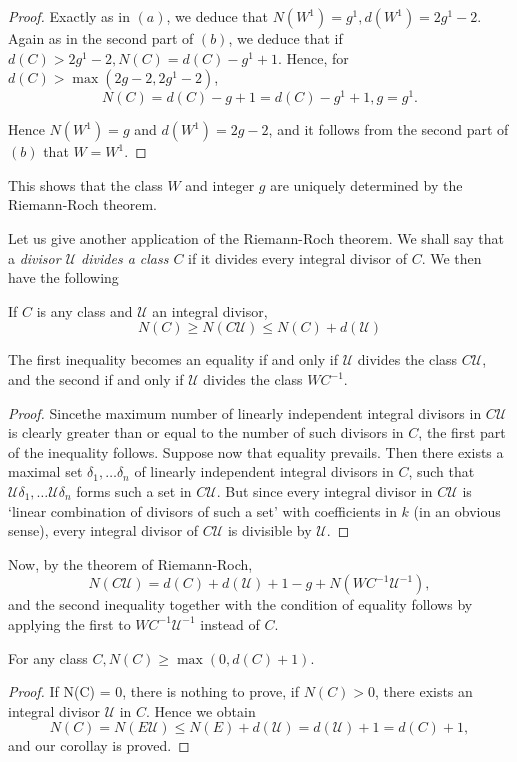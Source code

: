 \begin{proof}
  Exactly as in $(a)$, we deduce that $N(W^1) = g^1, d(W^1) =
  2g^1-2$. Again as in the second part of $(b)$, we deduce that if
  $d(C) > 2g^1 - 2, N(C) = d(C) - g^1 + 1$. Hence, for $d(C) > \max
  (2g - 2, 2g^1 - 2)$, 
  $$
  N(C) = d(C) - g + 1 = d(C) - g^1 + 1, g = g^1.
  $$

  Hence $N(W^1) = g$ and $d(W^1) = 2g - 2$, and it follows from the
  second part of $(b)$ that $W = W^1$. 
\end{proof}

This shows that the class $W$ and integer $g$ are uniquely determined
by the Riemann-Roch theorem. 

Let us give another application of the Riemann-Roch theorem. We shall
say that a \textit{ divisor $\mathscr{U}$ divides a class $C$ } if it
divides every integral divisor of $C$. We then have the following 
\begin{theorem*}
  If $C$ is any class and $\mathscr{U}$ an integral divisor,
  $$
  N (C) \ge N (C\mathscr{U}) \le N (C) + d (\mathscr{U})
  $$

  The first inequality becomes an equality if and only if
  $\mathscr{U}$ divides the class $C\mathscr{U}$, and the second if and only if
  $\mathscr{U}$ divides the class $WC^{-1}$. 
\end{theorem*}

\begin{proof}
  Since\pageoriginale the maximum number of linearly independent integral divisors
  in $C \mathscr{U}$ is clearly greater than or equal to the number
  of such divisors
  in $C$, the first part of the inequality follows. Suppose now that
  equality prevails. Then there exists a maximal set $\delta_1, \ldots
  \delta_n$ of linearly independent integral divisors in $C$, such
  that $\mathscr{U} \delta_1, \ldots \mathscr{U} \delta_n$ forms such
  a set in $C \mathscr{U}$. But since every integral divisor in $C
  \mathscr{U}$ is `linear combination of divisors of such a set' with
  coefficients in $k$ (in an obvious sense), every integral divisor of
  $C \mathscr{U}$ is divisible by $\mathscr{U}$. 
\end{proof}

Now, by the theorem of Riemann-Roch,
$$
N(C \mathscr{U}) = d (C) + d(\mathscr{U}) + 1 - g + N
(WC^{-1}\mathscr{U} ^{-1}), 
$$
and the second inequality together with the condition of equality
follows by applying the first to $WC^{-1} \mathscr{U}^{-1} $ instead
of $C$. 

\begin{coro*}%
  For any class $C, N(C) \ge \max (0, d(C) + 1)$.
\end{coro*}

\begin{proof}
  If N(C) = 0, there is nothing to prove, if $N(C) > 0$, there exists
  an integral divisor $\mathscr{U}$ in  $C$. Hence we obtain 
  $$
  N(C) = N (E \mathscr{U}) \le N(E) + d (\mathscr{U}) = d(\mathscr{U})
  + 1 = d(C) + 1, 
  $$
  and our corollay is proved.
\end{proof}
